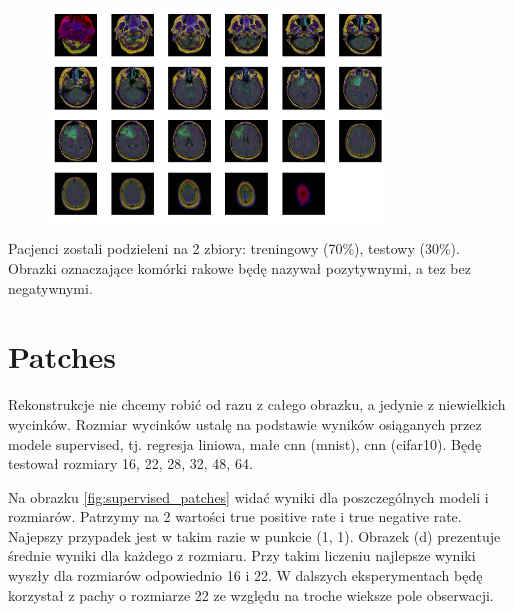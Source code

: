 \begin{figure}[h!]
    \centering
    \includegraphics[width=0.8\textwidth]{images/medical_sample}
    \caption{}
    \label{fig:medical_sample}
\end{figure}

Pacjenci zostali podzieleni na 2 zbiory: treningowy (70\%), testowy (30\%). Obrazki oznaczające komórki rakowe będę nazywał pozytywnymi, a tez bez negatywnymi.

\section{Patches}

Rekonstrukcje nie chcemy robić od razu z całego obrazku, a jedynie z niewielkich wycinków. Rozmiar wycinków ustalę na podstawie wyników osiąganych przez modele supervised, tj. regresja liniowa, małe cnn (mnist), cnn (cifar10). Będę testował rozmiary 16, 22, 28, 32, 48, 64. 

Na obrazku \ref{fig:supervised_patches} widać wyniki dla poszczególnych modeli i rozmiarów. Patrzymy na 2 wartości true positive rate i true negative rate. Najepszy przypadek jest w takim razie w punkcie (1, 1). Obrazek (d) prezentuje średnie wyniki dla każdego z rozmiaru. Przy takim liczeniu najlepsze wyniki wyszły dla rozmiarów odpowiednio 16 i 22. W dalszych eksperymentach będę korzystał z pachy o rozmiarze 22 ze względu na troche wieksze pole obserwacji.

